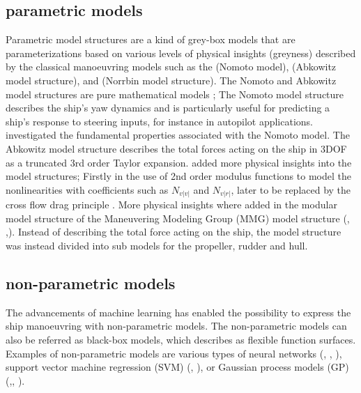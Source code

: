 \subsection{parametric models}
Parametric model structures are a kind of grey-box models that are parameterizations based on various levels of physical insights (greyness) described by the classical manoeuvring models such as the \cite{nomotoSteeringQualitiesShips1957} (Nomoto model), \cite{abkowitzShipHydrodynamicsSteering1964} (Abkowitz model structure), and \cite{norrbinTheoryObservationsUse1971} (Norrbin model structure). The Nomoto and Abkowitz model structures are pure mathematical models ; The Nomoto model structure describes the ship's yaw dynamics and is particularly useful for predicting a ship's response to steering inputs, for instance in autopilot applications. \cite{tzengFUNDAMENTALPROPERTIESLINEAR1999} investigated the fundamental properties associated with the Nomoto model. The Abkowitz model structure describes the total forces acting on the ship in 3DOF as a truncated 3rd order Taylor expansion. \cite{norrbinTheoryObservationsUse1971} added more physical insights into the model structures; Firstly in the use of 2nd order modulus functions  to model the nonlinearities with coefficients such as $N_{v|v|}$ and $N_{v|r|}$, later to be replaced by the cross flow drag principle \cite{fossenHandbookMarineCraft2011}. More physical insights where added in the modular model structure of the Maneuvering Modeling Group (MMG) model structure (\cite{ogawaMathematicalModelManoeuvring1978}, \cite{inouePracticalCalculationMethod1981},\cite{yasukawaIntroductionMMGStandard2015}). Instead of describing the total force acting on the ship, the model structure was instead divided into sub models for the propeller, rudder and hull.
\subsection{non-parametric models}
The advancements of machine learning has enabled the possibility to express the ship manoeuvring with non-parametric models. The non-parametric models can also be referred as black-box models, which \cite{ljungPerspectivesSystemIdentification2010} describes as flexible function surfaces.
Examples of non-parametric models are various types of neural networks (\cite{rajeshSystemIdentificationNonlinear2008}, \cite{heBlackBoxModelingShip2020}, \cite{heNonparametricModelingShip2022}), support vector machine regression (SVM) (\cite{chenOnlineModelingPrediction2023}, \cite{zihaowangKernelbasedSupportVector2020}), or Gaussian process models (GP) (\cite{zhangLocallyWeightedNonParametric2021},\cite{xueIdentificationPredictionShip2021}, \cite{xueOnlineIdentificationShip2022}).  

